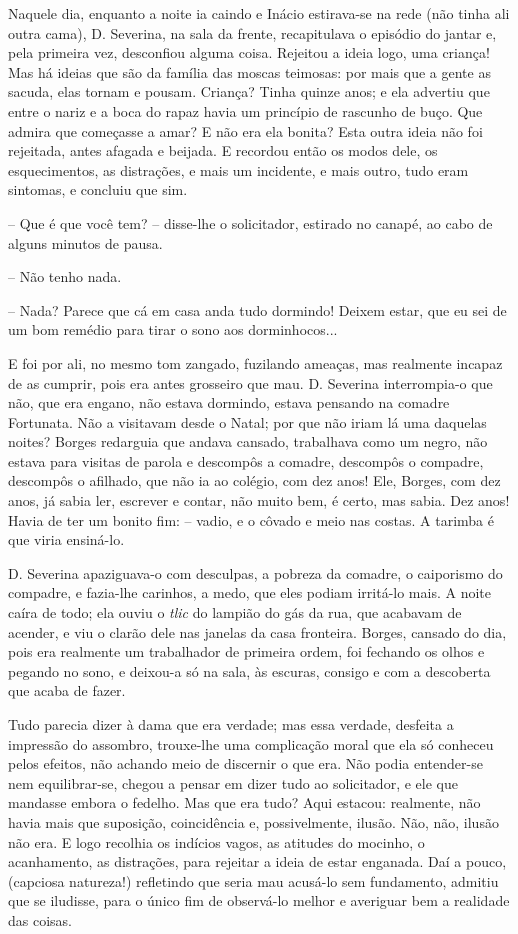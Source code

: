 Naquele dia, enquanto a noite ia caindo e Inácio estirava-se na rede
(não tinha ali outra cama), D. Severina, na sala da frente, recapitulava
o episódio do jantar e, pela primeira vez, desconfiou alguma coisa.
Rejeitou a ideia logo, uma criança! Mas há ideias que são da família das
moscas teimosas: por mais que a gente as sacuda, elas tornam e pousam.
Criança? Tinha quinze anos; e ela advertiu que entre o nariz e a boca do
rapaz havia um princípio de rascunho de buço. Que admira que começasse a
amar? E não era ela bonita? Esta outra ideia não foi rejeitada, antes
afagada e beijada. E recordou então os modos dele, os esquecimentos, as
distrações, e mais um incidente, e mais outro, tudo eram sintomas, e
concluiu que sim.

-- Que é que você tem? -- disse-lhe o solicitador, estirado no canapé,
ao cabo de alguns minutos de pausa.

-- Não tenho nada.

-- Nada? Parece que cá em casa anda tudo dormindo! Deixem estar, que eu
sei de um bom remédio para tirar o sono aos dorminhocos...

E foi por ali, no mesmo tom zangado, fuzilando ameaças, mas realmente
incapaz de as cumprir, pois era antes grosseiro que mau. D. Severina
interrompia-o que não, que era engano, não estava dormindo, estava
pensando na comadre Fortunata. Não a visitavam desde o Natal; por que
não iriam lá uma daquelas noites? Borges redarguia que andava cansado,
trabalhava como um negro, não estava para visitas de parola e descompôs
a comadre, descompôs o compadre, descompôs o afilhado, que não ia ao
colégio, com dez anos! Ele, Borges, com dez anos, já sabia ler, escrever
e contar, não muito bem, é certo, mas sabia. Dez anos! Havia de ter um
bonito fim: -- vadio, e o côvado e meio nas costas. A tarimba é que
viria ensiná-lo.

D. Severina apaziguava-o com desculpas, a pobreza da comadre, o
caiporismo do compadre, e fazia-lhe carinhos, a medo, que eles podiam
irritá-lo mais. A noite caíra de todo; ela ouviu o \emph{tlic} do
lampião do gás da rua, que acabavam de acender, e viu o clarão dele nas
janelas da casa fronteira. Borges, cansado do dia, pois era realmente um
trabalhador de primeira ordem, foi fechando os olhos e pegando no sono,
e deixou-a só na sala, às escuras, consigo e com a descoberta que acaba
de fazer.

Tudo parecia dizer à dama que era verdade; mas essa verdade, desfeita a
impressão do assombro, trouxe-lhe uma complicação moral que ela só
conheceu pelos efeitos, não achando meio de discernir o que era. Não
podia entender-se nem equilibrar-se, chegou a pensar em dizer tudo ao
solicitador, e ele que mandasse embora o fedelho. Mas que era tudo? Aqui
estacou: realmente, não havia mais que suposição, coincidência e,
possivelmente, ilusão. Não, não, ilusão não era. E logo recolhia os
indícios vagos, as atitudes do mocinho, o acanhamento, as distrações,
para rejeitar a ideia de estar enganada. Daí a pouco, (capciosa
natureza!) refletindo que seria mau acusá-lo sem fundamento, admitiu que
se iludisse, para o único fim de observá-lo melhor e averiguar bem a
realidade das coisas.

